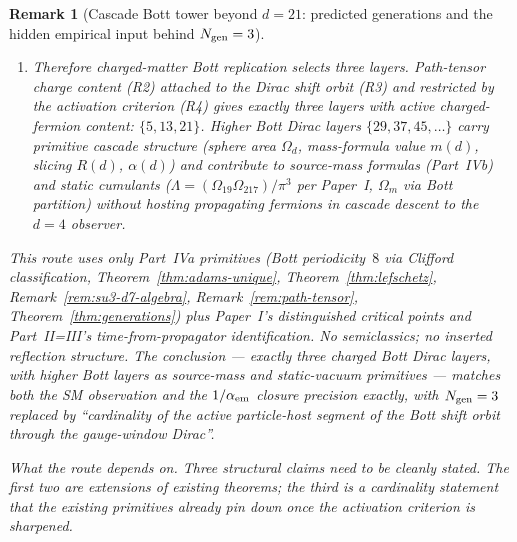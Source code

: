 \documentclass[12pt,a4paper]{article}
\newtheorem{remark}[theorem]{Remark}
\begin{document}
\begin{remark}[Cascade Bott tower beyond $d=21$: predicted generations and the hidden empirical input behind $N_{\rm gen}=3$]
\begin{enumerate}[label=(R\arabic*),nosep]
\item \emph{Therefore charged-matter Bott replication selects three layers.} Path-tensor charge content (R2) attached to the Dirac shift orbit (R3) and restricted by the activation criterion (R4) gives exactly three layers with active charged-fermion content: $\{5, 13, 21\}$. Higher Bott Dirac layers $\{29, 37, 45, \ldots\}$ carry primitive cascade structure (sphere area $\Omega_d$, mass-formula value $m(d)$, slicing $R(d)$, $\alpha(d)$) and contribute to source-mass formulas (Part~IVb) and static cumulants ($\Lambda = (\Omega_{19}\Omega_{217})/\pi^3$ per Paper~I, $\Omega_m$ via Bott partition) without hosting propagating fermions in cascade descent to the $d=4$ observer.
\end{enumerate}

This route uses only Part~IVa primitives (Bott periodicity~$8$ via Clifford classification, Theorem~\ref{thm:adams-unique}, Theorem~\ref{thm:lefschetz}, Remark~\ref{rem:su3-d7-algebra}, Remark~\ref{rem:path-tensor}, Theorem~\ref{thm:generations}) plus Paper~I's distinguished critical points and Part~II=III's time-from-propagator identification. No semiclassics; no inserted reflection structure. The conclusion --- exactly three charged Bott Dirac layers, with higher Bott layers as source-mass and static-vacuum primitives --- matches both the SM observation and the $1/\alpha_{\rm em}$ closure precision exactly, with $N_{\rm gen}=3$ replaced by ``cardinality of the active particle-host segment of the Bott shift orbit through the gauge-window Dirac''.

\medskip\noindent\emph{What the route depends on.} Three structural claims need to be cleanly stated. The first two are extensions of existing theorems; the third is a cardinality statement that the existing primitives already pin down once the activation criterion is sharpened.


\end{remark}
\end{document}
